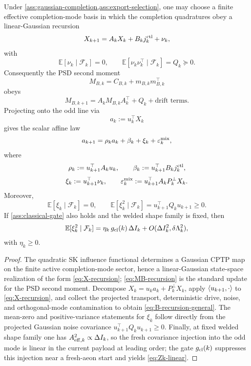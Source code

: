 \begin{proposition}
\label{prop:projected-affine}
Under \cref{ass:gaussian-completion,ass:export-selection}, one may choose a finite effective completion-mode basis in which
the completion quadratures obey a linear-Gaussian recursion
\begin{equation}
X_{k+1}=A_k X_k+B_k j_k^{\rm ctl}+\nu_k,
\label{eq:X-recursion}
\end{equation}
with
\[
\mathbb E[\nu_k\mid\mathcal F_k]=0,
\qquad
\mathbb E[\nu_k\nu_k^\top\mid\mathcal F_k]=Q_k\succeq 0.
\]
Consequently the PSD second moment
\[
M_{B,k}=C_{B,k}+m_{B,k}m_{B,k}^\top
\]
obeys
\begin{equation}
M_{B,k+1}=A_k M_{B,k}A_k^\top+Q_k+\text{drift terms}.
\label{eq:MB-recursion}
\end{equation}
Projecting onto the odd line via
\[
a_k:=u_k^\top X_k
\]
gives the scalar affine law
\begin{equation}
a_{k+1}
=
\rho_k a_k+\beta_k+\xi_k+\varepsilon_k^{\rm mix},
\label{eq:B-recursion-general}
\end{equation}
where
\[
\rho_k:=u_{k+1}^\top A_k u_k,\qquad
\beta_k:=u_{k+1}^\top B_k j_k^{\rm ctl},
\]
\[
\xi_k:=u_{k+1}^\top \nu_k,\qquad
\varepsilon_k^{\rm mix}:=u_{k+1}^\top A_k P_k^\perp X_k.
\]
Moreover,
\[
\mathbb E[\xi_k\mid\mathcal F_k]=0,
\qquad
\mathbb E[\xi_k^2\mid\mathcal F_k]=u_{k+1}^\top Q_k u_{k+1}\ge 0.
\]
If \cref{ass:classical-gate} also holds and the welded shape family is fixed, then
\begin{equation}
\mathbb E[\xi_k^2\mid\mathcal F_k]
=
\eta_k\,g_{\rm cl}(k)\,\Delta I_k+O(\Delta I_k^2,\delta\Lambda_k^2),
\label{eq:Zk-linear}
\end{equation}
with \(\eta_k\ge 0\).
\end{proposition}

\begin{proof}
The quadratic SK influence functional determines a Gaussian CPTP map on the finite active completion-mode sector, hence a
linear-Gaussian state-space realization of the form \eqref{eq:X-recursion}; \eqref{eq:MB-recursion} is the standard update
for the PSD second moment.
Decompose \(X_k=u_k a_k+P_k^\perp X_k\), apply \(\left\langle u_{k+1},\cdot\right\rangle\) to \eqref{eq:X-recursion}, and collect the projected
transport, deterministic drive, noise, and orthogonal-mode contamination to obtain \eqref{eq:B-recursion-general}.
The mean-zero and positive-variance statements for \(\xi_k\) follow directly from the projected Gaussian noise covariance
\(
u_{k+1}^\top Q_k u_{k+1}\ge 0
\).
Finally, at fixed welded shape family one has \(A_{{\rm eff},k}^2\propto \Delta I_k\), so the fresh covariance injection
into the odd mode is linear in the current payload at leading order; the gate \(g_{\rm cl}(k)\) suppresses this injection
near a fresh-aeon start and yields \eqref{eq:Zk-linear}.
\end{proof}

